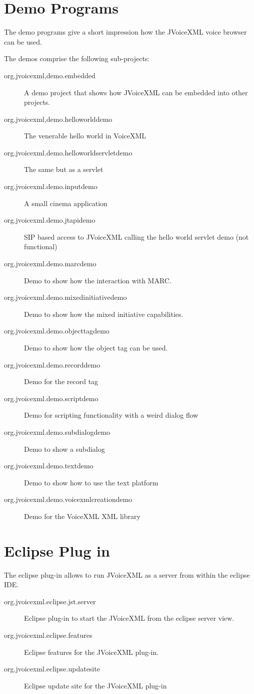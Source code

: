 \documentclass[11pt,a4paper]{article}
\begin{document}
\section{Demo Programs}

The demo programs give a short impression how the JVoiceXML voice browser can
be used.

The demos comprise the following sub-projects:

\begin{description}
\item[org.jvoicexml,demo.embedded] A demo project that shows how JVoiceXML can
be embedded into other projects.
\item[org.jvoicexml,demo.helloworlddemo] The venerable hello world in Voice\-XML
\item[org.jvoicexml.demo.helloworldservletdemo] The same but as a servlet
\item[org.jvoicexml.demo.inputdemo] A small cinema application
\item[org.jvoicexml.demo.jtapidemo] SIP based access to JVoiceXML calling the
hello world servlet demo (not functional)
\item[org.jvoicexml.demo.marcdemo] Demo to show how the interaction with MARC.
\item[org.jvoicexml.demo.mixedinitiativedemo] Demo to show how the mix\-ed
initiative capabilities.
\item[org.jvoicexml.demo.objecttagdemo] Demo to show how the object tag can be
used.
\item[org.jvoicexml.demo.recorddemo] Demo for the record tag
\item[org.jvoicexml.demo.scriptdemo] Demo for scripting functionality with a
weird dialog flow
\item[org.jvoicexml.demo.subdialogdemo] Demo to show a subdialog
\item[org.jvoicexml.demo.textdemo] Demo to show how to use the text platform
\item[org.jvoicexml.demo.voicexmlcreationdemo] Demo for the VoiceXML XML library
\end{description}

\section{Eclipse Plug in}

The eclipse plug-in allows to run JVoiceXML as a server from within the eclipse
IDE.

\begin{description}
\item[org.jvoicexml.eclipse.jst.server] Eclipse plug-in to start the JVoiceXML
from the eclipse server view.
\item[org.jvoicexml.eclipse.features] Eclipse features for the JVoiceXML
plug-in.
\item[org.jvoicexml.eclipse.updatesite] Eclipse update site for the
JVoiceXML plug-in
\end{description}
\end{document}
